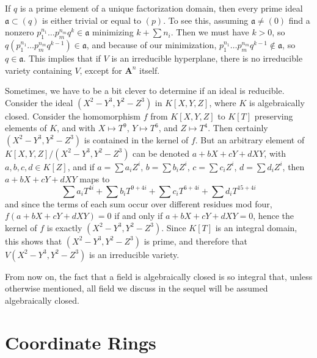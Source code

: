 \begin{example}
    If $q$ is a prime element of a unique factorization domain, then every prime ideal $\mathfrak{a} \subset (q)$ is either trivial or equal to $(p)$. To see this, assuming $\mathfrak{a} \neq (0)$ find a nonzero $p_1^{n_1} \dots p_m^{n_m} q^k \in \mathfrak{a}$ minimizing $k + \sum n_i$. Then we must have $k > 0$, so $q(p_1^{n_1} \dots p_m^{n_m} q^{k-1}) \in \mathfrak{a}$, and because of our minimization, $p_1^{n_1} \dots p_m^{n_m} q^{k-1} \not \in \mathfrak{a}$, so $q \in \mathfrak{a}$. This implies that if $V$ is an irreducible hyperplane, there is no irreducible variety containing $V$, except for $\mathbf{A}^n$ itself.
\end{example}

\begin{example}
    Sometimes, we have to be a bit clever to determine if an ideal is reducible. Consider the ideal $(X^2 - Y^3,Y^2 - Z^3)$ in $K[X,Y,Z]$, where $K$ is algebraically closed. Consider the homomorphism $f$ from $K[X,Y,Z]$ to $K[T]$ preserving elements of $K$, and with $X \mapsto T^9$, $Y \mapsto T^6$, and $Z \mapsto T^4$. Then certainly $(X^2 - Y^3, Y^2 - Z^3)$ is contained in the kernel of $f$. But an arbitrary element of $K[X,Y,Z]/(X^2 - Y^3, Y^2 - Z^3)$ can be denoted $a + bX + cY + dXY$, with $a,b,c,d \in K[Z]$, and if $a = \sum a_i Z^i$, $b = \sum b_i Z^i$, $c = \sum c_i Z^i$, $d = \sum d_iZ^i$, then $a + bX + cY + dXY$ maps to
    \[ \sum a_i T^{4i} + \sum b_i T^{9 + 4i} + \sum c_i T^{6 + 4i} + \sum d_i T^{15 + 4i} \]
    and since the terms of each sum occur over different residues mod four, $f(a + bX + cY + dXY) = 0$ if and only if $a + bX + cY + dXY = 0$, hence the kernel of $f$ is exactly $(X^2 - Y^3, Y^2 - Z^3)$. Since $K[T]$ is an integral domain, this shows that $(X^2 - Y^3, Y^2 - Z^3)$ is prime, and therefore that $V(X^2 - Y^3, Y^2 - Z^3)$ is an irreducible variety.
\end{example}

From now on, the fact that a field is algebraically closed is so integral that, unless otherwise mentioned, all field we discuss in the sequel will be assumed algebraically closed.

\section{Coordinate Rings}

